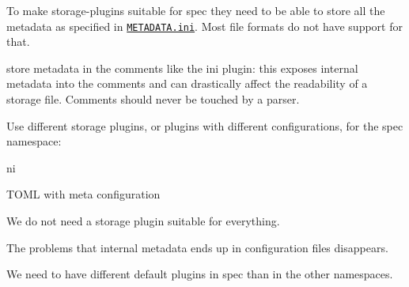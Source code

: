 To make storage-\/plugins suitable for {\ttfamily spec} they need to be able to store all the metadata as specified in \href{/home/jenkins/workspace/libelektra-release/doc/METADATA.ini}{\tt M\+E\+T\+A\+D\+A\+T\+A.\+ini}. Most file formats do not have support for that.


\begin{DoxyItemize}
\item store metadata in the comments like the {\ttfamily ini} plugin\+: this exposes internal metadata into the comments and can drastically affect the readability of a storage file. Comments should never be touched by a parser.
\end{DoxyItemize}

Use different storage plugins, or plugins with different configurations, for the {\ttfamily spec} namespace\+:


\begin{DoxyItemize}
\item {\ttfamily ni}
\item T\+O\+ML with {\ttfamily meta} configuration
\end{DoxyItemize}


\begin{DoxyItemize}
\item We do not need a storage plugin suitable for everything.
\item The problems that internal metadata ends up in configuration files disappears.
\end{DoxyItemize}

We need to have different default plugins in {\ttfamily spec} than in the other namespaces.